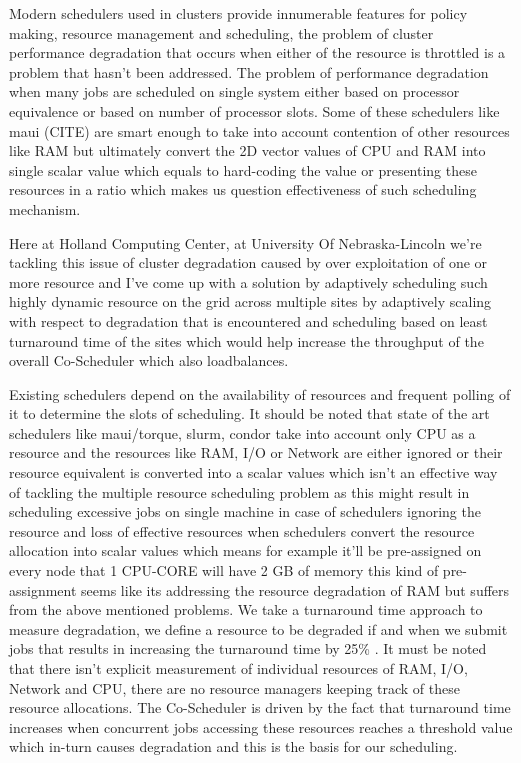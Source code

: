 \documentclass[ms,electronic,double]{nuthesis}
\begin{document}
Modern schedulers used in clusters provide innumerable features for policy making, resource management 
and scheduling, the problem of cluster 
performance degradation that occurs when either of the resource is throttled is a problem that hasn't been 
addressed. The problem of performance degradation when many jobs are scheduled on single system 
either based on processor equivalence or based on number of processor slots. Some of 
these schedulers like maui (CITE) are smart enough to take into account contention of other 
resources like RAM but ultimately convert the 2D vector values of CPU and RAM 
into single scalar value which equals to hard-coding the value or presenting these resources
in a ratio which makes us question effectiveness of such scheduling mechanism. 

Here at Holland Computing Center, at University Of Nebraska-Lincoln we're 
tackling this issue of cluster degradation caused by 
over exploitation of one or more resource and I've come up with a solution by adaptively scheduling 
such highly dynamic resource on the grid across multiple sites by adaptively scaling with respect to
degradation that is encountered and scheduling based on least turnaround time of the sites which would help increase 
the throughput of the overall Co-Scheduler which also loadbalances.

Existing schedulers depend on the availability of resources and frequent polling 
of it to determine the slots of scheduling. It should be noted that state of the art 
schedulers like maui/torque, slurm, condor take into account only CPU as a 
resource and the resources like RAM, I/O or Network are either ignored or 
their resource equivalent is converted into a scalar values which isn't an effective way of tackling the 
multiple resource scheduling problem as this might result in scheduling excessive jobs 
on single machine in case of schedulers ignoring the resource and loss of 
effective resources when schedulers convert the resource allocation into scalar 
values which means for example it'll be pre-assigned on every node that 1 CPU-CORE will have 2 GB of
memory this kind of pre-assignment seems like its addressing the resource degradation of RAM but suffers 
from the above mentioned problems.
We take a turnaround time approach to measure degradation, we define a resource 
to be degraded if and when we submit jobs that results in increasing the 
turnaround time by 25\% . It must be 
noted that there isn't explicit measurement of individual resources of RAM, I/O, 
Network and CPU, there are no resource managers keeping track of these resource allocations. 
The Co-Scheduler is driven by the fact that turnaround time increases when 
concurrent jobs accessing these resources reaches a threshold value which in-turn causes 
degradation and this is the basis for our scheduling.
\end{document}
